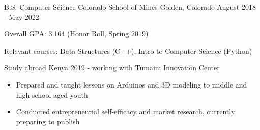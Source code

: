 

\begin{cventries}

  \cventry
    {B.S. Computer Science}
    {Colorado School of Mines} %
    {Golden, Colorado} %
    {August 2018 - May 2022} %
    {
      \begin{cvitems} %
        \item {Overall GPA: 3.164 (Honor Roll, Spring 2019)}
        \item {Relevant courses: Data Structures (C++), Intro to Computer Science
    (Python)}
\item {Study abroad Kenya 2019 - working with Tumaini Innovation Center}
  \begin{itemize}
    \item {Prepared and taught lessons on Arduinos and 3D modeling to middle and high school aged youth}
    \item {Conducted entrepreneurial self-efficacy and market research, currently preparing to publish}
\end{itemize}
      \end{cvitems}
    }
    

\end{cventries}

